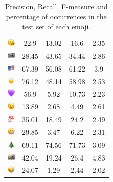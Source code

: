 \documentclass{article}
\begin{document}
\begin{table}
\begin{tabular}{|c|ccc|c|}
\includegraphics[height=0.37cm,width=0.37cm]{img/face_blowing_a_kiss.png} & 22.9 & 13.02 & 16.6 & 2.35\\ 
\includegraphics[height=0.37cm,width=0.37cm]{img/camera.png} & 28.45 & 43.65 & 34.44 & 2.86\\ 
\includegraphics[height=0.37cm,width=0.37cm]{img/United_States.png} & 67.39 & 56.08 & 61.22 & 3.9\\ 
\includegraphics[height=0.37cm,width=0.37cm]{img/sun.png} & 76.12 & 48.14 & 58.98 & 2.53\\ 
\includegraphics[height=0.37cm,width=0.37cm]{img/purple_heart.png} & 56.9 & 5.92 & 10.73 & 2.23\\ 
\includegraphics[height=0.37cm,width=0.37cm]{img/winking_face.png} & 13.89 & 2.68 & 4.49 & 2.61\\ 
\includegraphics[height=0.37cm,width=0.37cm]{img/hundred_points.png} & 35.01 & 18.49 & 24.2 & 2.49\\ 
\includegraphics[height=0.37cm,width=0.37cm]{img/beaming_face_with_smiling_eyes.png} & 29.85 & 3.47 & 6.22 & 2.31\\ 
\includegraphics[height=0.37cm,width=0.37cm]{img/Christmas_tree.png} & 69.11 & 74.56 & 71.73 & 3.09\\ 
\includegraphics[height=0.37cm,width=0.37cm]{img/camera_with_flash.png} & 42.04 & 19.24 & 26.4 & 4.83\\ 
\includegraphics[height=0.37cm,width=0.37cm]{img/winking_face_with_tongue.png} & 24.07 & 1.29 & 2.44 & 2.02\\ 

\hline
\end{tabular}
\caption{\label{table:emoji_detailed} Precision, Recall, F-measure and percentage of occurrences in the test set of each emoji.}
\end{table}
\end{document}
